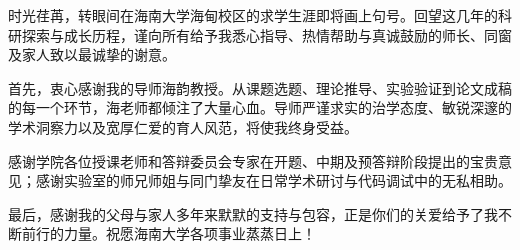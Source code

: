 
\begin{acknowledgements}
时光荏苒，转眼间在海南大学海甸校区的求学生涯即将画上句号。回望这几年的科研探索与成长历程，谨向所有给予我悉心指导、热情帮助与真诚鼓励的师长、同窗及家人致以最诚挚的谢意。

首先，衷心感谢我的导师海韵教授。从课题选题、理论推导、实验验证到论文成稿的每一个环节，海老师都倾注了大量心血。导师严谨求实的治学态度、敏锐深邃的学术洞察力以及宽厚仁爱的育人风范，将使我终身受益。

感谢学院各位授课老师和答辩委员会专家在开题、中期及预答辩阶段提出的宝贵意见；感谢实验室的师兄师姐与同门挚友在日常学术研讨与代码调试中的无私相助。

最后，感谢我的父母与家人多年来默默的支持与包容，正是你们的关爱给予了我不断前行的力量。祝愿海南大学各项事业蒸蒸日上！
\end{acknowledgements}
